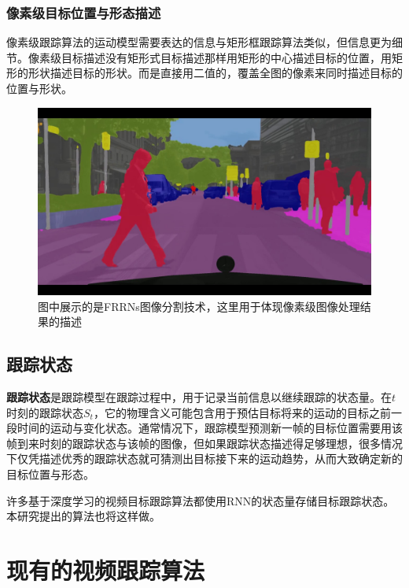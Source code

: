 \subsubsection{像素级目标位置与形态描述}
像素级跟踪算法的运动模型需要表达的信息与矩形框跟踪算法类似，但信息更为细节。像素级目标描述没有矩形式目标描述那样用矩形的中心描述目标的位置，用矩形的形状描述目标的形状。而是直接用二值的，覆盖全图的像素来同时描述目标的位置与形状。
\par
\begin{figure}[htbp!]
    \centering
    \includegraphics[width = 1.\textwidth]{chap/img/maxresdefault.jpg}
    \caption{图中展示的是FRRNs图像分割技术\supercite{frnn_youtube}\supercite{pohlen2017full}，这里用于体现像素级图像处理结果的描述}
    \label{fig:bunding_boxes}
\end{figure}
\par

\subsection{跟踪状态} \label{section:tracking_state}
\textbf{跟踪状态}是跟踪模型在跟踪过程中，用于记录当前信息以继续跟踪的状态量。在$t$时刻的跟踪状态$S_t$，它的物理含义可能包含用于预估目标将来的运动的目标之前一段时间的运动与变化状态。通常情况下，跟踪模型预测新一帧的目标位置需要用该帧到来时刻的跟踪状态与该帧的图像，但如果跟踪状态描述得足够理想，很多情况下仅凭描述优秀的跟踪状态就可猜测出目标接下来的运动趋势，从而大致确定新的目标位置与形态。
\par
许多基于深度学习的视频目标跟踪算法都使用RNN的状态量存储目标跟踪状态。本研究提出的算法也将这样做。


\section{现有的视频跟踪算法}
